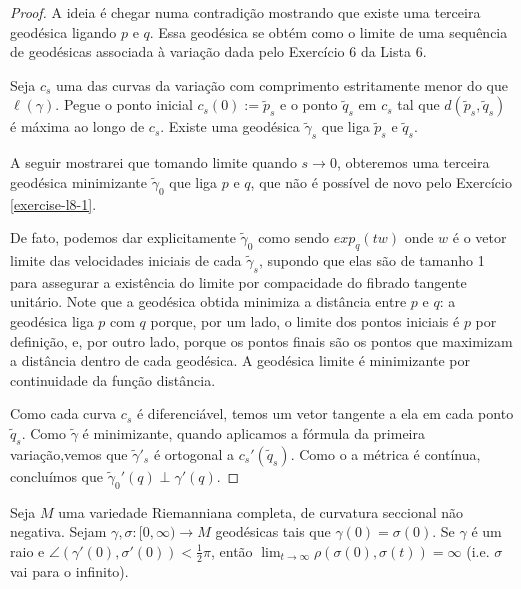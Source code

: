 \begin{proof}
A ideia é chegar numa contradição mostrando
que existe uma terceira geodésica
ligando $p$ e $q$. Essa geodésica se obtém
como o limite de uma sequência de
geodésicas associada à variação dada pelo
Exercício 6 da Lista 6.

Seja $c_s$ uma das curvas da variação com
comprimento estritamente
menor do que $\ell(\gamma)$. Pegue o ponto
inicial $c_s(0):=\tilde{p}_s$ e o
ponto $\tilde{q}_s$ em $c_s$ tal que
$d(\tilde{p}_s,\tilde{q}_s)$ é máxima ao
longo de $c_s$. Existe uma geodésica
$\tilde{\gamma}_s$ que liga
$\tilde{p}_s$ e $\tilde{q}_s$.

A seguir mostrarei que tomando limite quando
$s \to 0$, obteremos uma terceira
geodésica minimizante $\tilde{\gamma}_0$ que
liga $p$ e $q$, que não é possível
de novo pelo Exercício \ref{exercise-l8-1}.

De fato, podemos dar explicitamente
$\tilde{\gamma}_0$ como sendo $exp_q(tw)$
onde $w$ é o vetor limite das velocidades
iniciais de cada $\tilde{\gamma}_s$,
supondo que elas são de tamanho 1 para
assegurar a existência do limite por
compacidade do fibrado tangente unitário.
Note que a geodésica obtida minimiza a
distância entre $p$ e $q$: a geodésica liga
$p$ com  $q$ porque, por um lado, o
limite dos pontos iniciais é $p$ por
definição, e, por outro lado, porque os
pontos finais são os pontos que maximizam a
distância dentro de cada geodésica.
A geodésica limite é minimizante por
continuidade da função distância.

Como cada curva $c_s$ é diferenciável, temos
um vetor tangente a ela em cada
ponto $\tilde{q}_s$. Como $\tilde{\gamma}$ é
minimizante, quando aplicamos a
fórmula da primeira variação,vemos que
$\tilde{\gamma}'_s$ é ortogonal a
$c_s'(\tilde{q}_s)$. Como o a métrica é
contínua, concluímos que
$\tilde{\gamma}_0'(q) \perp \gamma'(q)$.
\end{proof}

\begin{exercise}
\label{exercise-l8-11}
Seja $M$ uma variedade Riemanniana completa,
de curvatura seccional não
negativa. Sejam $\gamma,\sigma:[0,\infty) \to
M$ geodésicas tais que
$\gamma(0)=\sigma(0)$. Se $\gamma$ é um raio
e
$\angle(\gamma'(0),\sigma'(0))<\frac{1}{2}
\pi$,
então $\lim_{t \to \infty}
\rho(\sigma(0),\sigma(t))=\infty$ (i.e.
$\sigma$ vai para o infinito).
\end{exercise}

